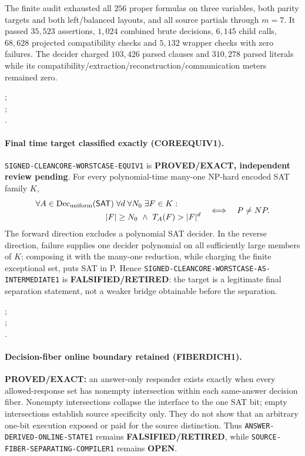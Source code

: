 \documentclass[11pt]{article}
\newcommand{\SAT}{\mathsf{SAT}}
\begin{document}
The finite audit exhausted all \(256\) proper formulas on three variables,
both parity targets and both left/balanced layouts, and all source partials
through \(m=7\).  It passed \(35{,}523\) assertions, \(1{,}024\) combined
brute decisions, \(6{,}145\) child calls, \(68{,}628\) projected
compatibility checks and \(5{,}132\) wrapper checks with zero failures.
The decider charged \(103{,}426\) parsed clauses and \(310{,}278\) parsed
literals while its compatibility/extraction/reconstruction/communication
meters remained zero.

;\\
;\\
.

\paragraph{Final time target classified exactly (COREEQUIV1).}
\texttt{SIGNED-CLEANCORE-WORSTCASE-EQUIV1} is
\textbf{PROVED/EXACT, independent review pending}.  For every polynomial-time
many-one NP-hard encoded SAT family \(K\),
\[
\begin{split}
&\forall A\in\operatorname{Dec}_{\rm uniform}(\SAT)\;
\forall d\;\forall N_0\;\exists F\in K:\\
&\hspace{30mm}|F|\ge N_0\ \wedge\ T_A(F)>|F|^d
\end{split}
\quad\Longleftrightarrow\quad P\ne NP.
\]
The forward direction excludes a polynomial SAT decider.  In the reverse
direction, failure supplies one decider polynomial on all sufficiently large
members of \(K\); composing it with the many-one reduction, while charging
the finite exceptional set, puts SAT in P.  Hence
\texttt{SIGNED-CLEANCORE-WORSTCASE-AS-INTERMEDIATE1} is
\textbf{FALSIFIED/RETIRED}: the target is a legitimate final separation
statement, not a weaker bridge obtainable before the separation.

;\\
;\\
.

\paragraph{Decision-fiber online boundary retained (FIBERDICH1).}
\textbf{PROVED/EXACT:} an answer-only responder exists exactly when every
allowed-response set has nonempty intersection within each same-answer
decision fiber.  Nonempty intersections collapse the interface to the one
SAT bit; empty intersections establish source specificity only.  They do not
show that an arbitrary one-bit execution exposed or paid for the source
distinction.  Thus \texttt{ANSWER-DERIVED-ONLINE-STATE1} remains
\textbf{FALSIFIED/RETIRED}, while
\texttt{SOURCE-FIBER-SEPARATING-COMPILER1} remains \textbf{OPEN}.
\end{document}
